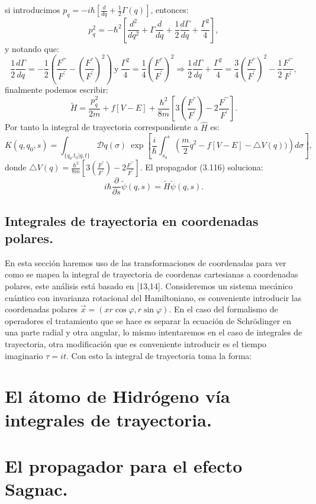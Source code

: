 si introducimos $p_q=-i\hbar\left[\frac{d}{dq}+\frac{1}{2}\Gamma(q)\right]$, entonces:
\begin{equation}
p_{q}^{2}=-\hbar^{2}\left[\frac{d^{2}}{dq^{2}}+\Gamma\frac{d}{dq}+\frac{1}{2}\frac{d\Gamma}{dq}+\frac{\Gamma^{2}}{4}\right],
\end{equation}
y notando que:
\begin{equation}
\frac{1}{2}\frac{d\Gamma}{dq}=-\frac{1}{2}\left(\frac{F^{'''}}{F^{'}}-\left(\frac{F^{''}}{F^{'}}\right)^{2}\right)\ \text{y}\ \frac{\Gamma^{2}}{4}=\frac{1}{4}\left(\frac{F^{''}}{F^{'}}\right)^{2}\Rightarrow\frac{1}{2}\frac{d\Gamma}{dq}+\frac{\Gamma^{2}}{4}
 =\frac{3}{4}\left(\frac{F^{''}}{F^{'}}\right)^{2}-\frac{1}{2}\frac{F^{\text{'''}}}{F^{'}},
\end{equation}
finalmente podemos escribir:
\begin{equation}
\tilde{H}=\frac{p_{q}^{2}}{2m}+f[V-E]+\frac{\hbar^{2}}{8m}\left[3\left(\frac{F^{''}}{F^{'}}\right)-2\frac{F^{\text{'''}}}{F^{'}}\right] .
\end{equation}
Por tanto la integral de trayectoria correspondiente a $\hat{H}$ es:
\begin{equation}
K(q,q_{0},s)=\int_{\{q_{0}.t_{0}|q,t\}}\mathcal{D}q(\sigma)\ \exp\left[\frac{i}{\hbar}\int_{s_{0}}^{s}\left(\frac{m}{2}\dot{q}^{2}-f[V-E]-\triangle V(q))\right)d\sigma\right] ,
\end{equation} 
donde $\triangle V(q)=\frac{\hbar^{2}}{8m}\left[3\left(\frac{F^{''}}{F^{'}}\right)-2\frac{F^{\text{'''}}}{F^{'}}\right]$. El propagador (3.116) soluciona:
\begin{equation}
i\hbar\frac{\partial}{\partial s}\tilde{\psi}(q,s)=\tilde{H}\tilde{\psi}(q,s).
\end{equation}
\subsection{Integrales de trayectoria en coordenadas polares.}
En esta sección haremos uso de las transformaciones de coordenadas para ver como se mapea la integral de trayectoria de coordenas cartesianas a coordenadas polares, este análisis está basado en [13,14]. Consideremos un sistema mecánico cuántico con invarianza rotacional del Hamiltoniano, es conveniente introducir las coordenadas polares $\vec{x}=(x r\cos \varphi,r\sin \varphi)$. En el caso del formalismo de operadores el tratamiento que se hace es separar la ecuación de Schrödinger en una parte radial y otra angular, lo mismo intentaremos en el caso de integrales de trayectoria, otra modificación que es conveniente introducir es el tiempo imaginario $\tau=it$. Con esto la integral de trayectoria toma la forma:

 
\section{El átomo de Hidrógeno vía integrales de trayectoria.}
\section{El propagador para el efecto Sagnac.}